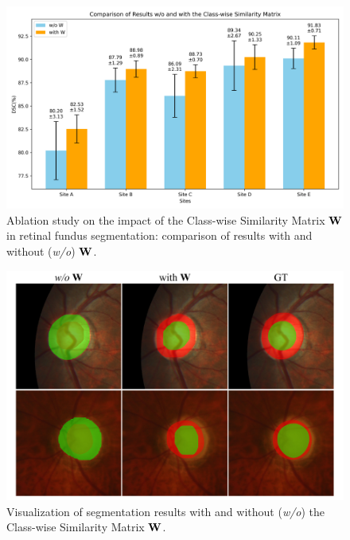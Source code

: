 \begin{figure}[!t]
    \centering
    \includegraphics[width=0.899\linewidth]{Figures/class_simi_ma.png}
    \caption{Ablation study on the impact of the Class-wise Similarity Matrix $\bold{W}$ in retinal fundus segmentation: comparison of results with and without (\textit{w/o}) $\bold{W}$.}
    \label{fig:class_simi_ma}
\end{figure}

\begin{figure}[!t]
    \centering
    \includegraphics[width=0.999\linewidth]{Figures/visual_class.pdf}
    \caption{Visualization of segmentation results with and without (\textit{w/o}) the Class-wise Similarity Matrix $\bold{W}$.}
    \label{fig:class_w}
\end{figure}

